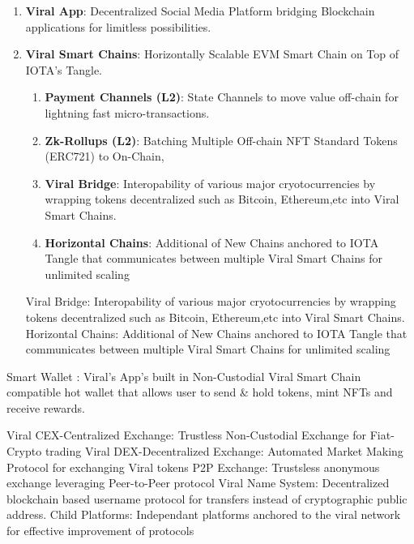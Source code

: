 \documentclass[10pt]{article}
\begin{document}
\begin{enumerate}

\item \textbf{Viral App}: Decentralized Social Media Platform bridging Blockchain applications for limitless possibilities.

\item \textbf{Viral Smart Chains}: Horizontally Scalable EVM Smart Chain on Top of IOTA's Tangle.

\begin{enumerate}

	\item \textbf{Payment Channels (L2)}: State Channels to move value off-chain for lightning fast micro-transactions.

	\item \textbf{Zk-Rollups (L2)}: Batching Multiple Off-chain NFT Standard Tokens (ERC721) to On-Chain,
	\item \textbf{Viral Bridge}: Interopability of various major cryotocurrencies by wrapping tokens decentralized such as Bitcoin, Ethereum,etc into Viral Smart Chains.
	\item \textbf{Horizontal Chains}: Additional of New Chains anchored to IOTA Tangle that communicates between multiple Viral Smart Chains for unlimited scaling

\end{enumerate}
	
Viral Bridge: Interopability of various major cryotocurrencies by wrapping tokens decentralized such as Bitcoin, Ethereum,etc into Viral Smart Chains.
Horizontal Chains: Additional of New Chains anchored to IOTA Tangle that communicates between multiple Viral Smart Chains for unlimited scaling

\end{enumerate}


Smart Wallet : Viral's App's built in Non-Custodial Viral Smart Chain compatible hot wallet that allows user to send \& hold tokens, mint NFTs and receive rewards.

Viral CEX-Centralized Exchange: Trustless Non-Custodial Exchange for Fiat-Crypto trading
Viral DEX-Decentralized Exchange: Automated Market Making Protocol for exchanging Viral tokens
P2P Exchange: Trustsless anonymous exchange leveraging Peer-to-Peer protocol
Viral Name System: Decentralized blockchain based username protocol for transfers instead of cryptographic public address.
Child Platforms: Independant platforms anchored to the viral network for effective improvement of protocols
\end{document}
